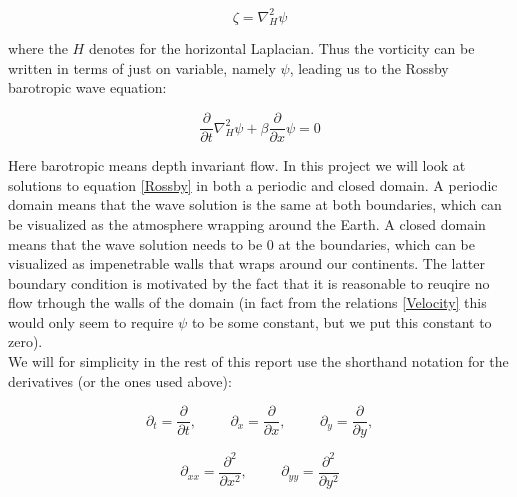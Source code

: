 \documentclass[12pt]{article}
\numberwithin{figure}{section}
\numberwithin{table}{section}
\begin{document}
\begin{equation}
	\zeta = \nabla_H^2 \psi 
\end{equation}

\noindent where the $H$ denotes for the horizontal Laplacian. Thus the vorticity can be written in terms of just on variable, namely $\psi$, leading us to the Rossby barotropic wave equation:

\begin{equation}
	\frac{\partial}{\partial t} \nabla_H^2 \psi + \beta \frac{\partial}{\partial x} \psi = 0
    \label{Rossby}
\end{equation}

\noindent Here barotropic means depth invariant flow. In this project we will look at solutions to equation \eqref{Rossby} in both a periodic and closed domain. A periodic domain means that the wave solution is the same at both boundaries, which can be visualized as the atmosphere wrapping around the Earth. A closed domain means that the wave solution needs to be 0 at the boundaries, which can be visualized as impenetrable walls that wraps around our continents. The latter boundary condition is motivated by the fact that it is reasonable to reuqire no flow trhough the walls of the domain (in fact from the relations \eqref{Velocity} this would only seem to require $\psi$ to be some constant, but we put this constant to zero). \\

\noindent We will for simplicity in the rest of this report use the shorthand notation for the derivatives (or the ones used above):

\begin{equation*}
	\partial_t = \frac{\partial}{\partial t}, \hspace{1cm} \partial_x = \frac{\partial}{\partial x}, \hspace{1cm} \partial_y = \frac{\partial}{\partial y},
\end{equation*}

\begin{equation*}
	\partial_{xx} = \frac{\partial^2}{\partial x^2}, \hspace{1cm} \partial_{yy} = \frac{\partial^2}{\partial y^2}
\end{equation*}










\end{document}
